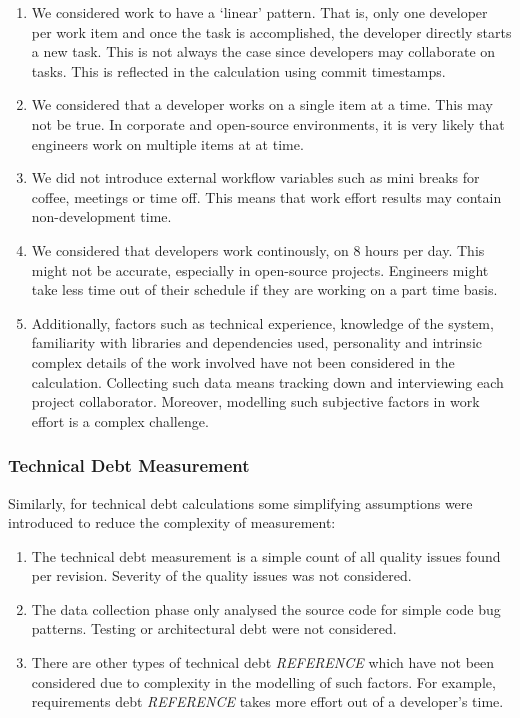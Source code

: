 \documentclass{mpaper}
\begin{document}
\begin{enumerate}
  \item We considered work to have a `linear' pattern. That is, only one
  developer per work item and once the task is accomplished, the developer
  directly starts a new task. This is not always the case since developers may
  collaborate on tasks. This is reflected in the calculation using commit
  timestamps. 
  \item We considered that a developer works on a single item at a time. This
  may not be true. In corporate and open-source environments, it is very likely
  that engineers work on multiple items at at time.  
  \item We did not introduce external workflow variables such as mini breaks for
  coffee, meetings or time off. This means that work effort results may contain
  non-development time. 
  \item We considered that developers work continously, on 8 hours per day. This
  might not be accurate, especially in open-source projects. Engineers might
  take less time out of their schedule if they are working on a part time basis.
  \item Additionally, factors such as technical experience, knowledge of the system,
  familiarity with libraries and dependencies used, personality and intrinsic
  complex details of the work involved have not been considered in the
  calculation. Collecting such data means tracking down and interviewing each
  project collaborator. Moreover, modelling such subjective factors in work effort
  is a complex challenge. 
\end{enumerate}

\subsubsection*{Technical Debt Measurement}
\label{validity-td}

Similarly, for technical debt calculations some simplifying assumptions were
introduced to reduce the complexity of measurement:

\begin{enumerate}
  \item The technical debt measurement is a simple count of all quality issues
  found per revision. Severity of the quality issues was not considered.
  \item The data collection phase only analysed the source code for simple code
  bug patterns. Testing or architectural debt were not considered. 
  \item There are other types of technical debt \emph{REFERENCE} which have not
  been considered due to complexity in the modelling of such factors. For
  example, requirements debt \emph{REFERENCE} takes more effort out of a
  developer's time.
\end{enumerate}
\end{document}
